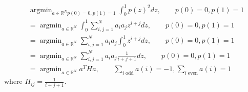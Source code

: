\documentclass{article}
\theoremstyle{definition}
\theoremstyle{remark}
\numberwithin{equation}{section}
\DeclareMathOperator{\argmin}{argmin}
\begin{document}
\begin{align*}
& \argmin_{a\in\mathbb{R}^N p(0)=0,p(1)=1} \int_0^1 p(z)^2 dz, \qquad p(0)=0, p(1)=1 \\
&=\argmin_{a\in\mathbb{R}^N} \int_0^1 \sum_{i,j=1}^N a_ia_j z^{i+j} dz, \qquad p(0)=0, p(1)=1\\
&= \argmin_{a\in\mathbb{R}^N} \sum_{i,j=1}^N a_ia_j \int_0^1 z^{i+j} dz, \qquad p(0)=0, p(1)=1\\
&= \argmin_{a\in\mathbb{R}^N} \sum_{i,j=1}^N a_ia_j \frac{1}{i+j+1} dz, \qquad p(0)=0, p(1)=1\\
&= \argmin_{a\in\mathbb{R}^N} a^T H a, \qquad \sum_{i \;\text{odd}} a(i) = -1, \sum_{i \;\text{even}} a(i) = 1
\end{align*} where $H_{ij} = \frac{1}{i+j+1}$. \\
\end{document}
